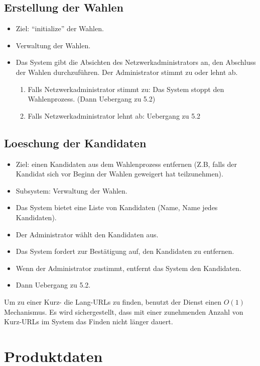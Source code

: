 \documentclass[parskip=full,11pt,twoside]{scrartcl}
\begin{document}
\subsection{Erstellung der Wahlen}
\begin{itemize}
	\item Ziel: “initialize” der Wahlen.
	\item Verwaltung der Wahlen.
	\item Das System gibt die Absichten des Netzwerkadministrators an, den Abschluss der Wahlen durchzuführen.
Der Administrator stimmt zu oder lehnt ab.
	\begin{enumerate}
		\item Falls Netzwerkadministrator stimmt zu: Das System stoppt den Wahlenprozess. (Dann Uebergang 
zu 5.2)
		\item Falls Netzwerkadministrator lehnt ab: Uebergang zu 5.2
	\end{enumerate}
\end{itemize}

\subsection{Loeschung der Kandidaten}
\begin{itemize}
	\item Ziel: einen Kandidaten aus dem Wahlenprozess entfernen (Z.B, falls der Kandidat sich vor Beginn der Wahlen geweigert hat teilzunehmen).
	\item Subsystem: Verwaltung der Wahlen.
	\item Das System bietet eine Liste von Kandidaten (Name, Name jedes Kandidaten).
	\item Der Administrator wählt den Kandidaten aus.
	\item Das System fordert zur Bestätigung auf, den Kandidaten zu entfernen.
	\item Wenn der Administrator zustimmt, entfernt das System den Kandidaten. 
	\item Dann Uebergang zu 5.2.
\end{itemize}

Um zu einer Kurz- die Lang-URLs zu finden,
benutzt der Dienst einen $O(1)$ Mechanismus.
Es wird sichergestellt,
dass mit einer zunehmenden Anzahl von Kurz-URLs im System
das Finden nicht länger dauert.

\section{Produktdaten}
\end{document}
